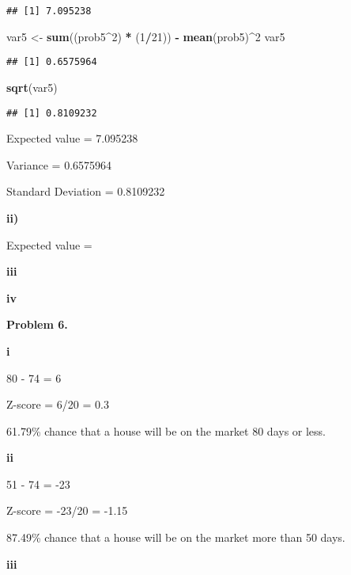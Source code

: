 \documentclass[
]{article}
\newenvironment{Shaded}{\begin{snugshade}}{\end{snugshade}}
\newcommand{\DecValTok}[1]{\textcolor[rgb]{0.00,0.00,0.81}{#1}}
\newcommand{\KeywordTok}[1]{\textcolor[rgb]{0.13,0.29,0.53}{\textbf{#1}}}
\newcommand{\NormalTok}[1]{#1}
\newcommand{\OperatorTok}[1]{\textcolor[rgb]{0.81,0.36,0.00}{\textbf{#1}}}
\newcommand{\StringTok}[1]{\textcolor[rgb]{0.31,0.60,0.02}{#1}}
\begin{document}
\begin{verbatim}
## [1] 7.095238
\end{verbatim}

\begin{Shaded}
\begin{Highlighting}[]
\NormalTok{var5 <-}\StringTok{ }\KeywordTok{sum}\NormalTok{((prob5}\OperatorTok{^}\DecValTok{2}\NormalTok{) }\OperatorTok{*}\StringTok{ }\NormalTok{(}\DecValTok{1}\OperatorTok{/}\DecValTok{21}\NormalTok{)) }\OperatorTok{-}\StringTok{ }\KeywordTok{mean}\NormalTok{(prob5)}\OperatorTok{^}\DecValTok{2}
\NormalTok{var5}
\end{Highlighting}
\end{Shaded}

\begin{verbatim}
## [1] 0.6575964
\end{verbatim}

\begin{Shaded}
\begin{Highlighting}[]
\KeywordTok{sqrt}\NormalTok{(var5)}
\end{Highlighting}
\end{Shaded}

\begin{verbatim}
## [1] 0.8109232
\end{verbatim}

Expected value = 7.095238

Variance = 0.6575964

Standard Deviation = 0.8109232

\textbf{ii)}

Expected value =

\textbf{iii}

\textbf{iv}

\textbf{Problem 6.}

\textbf{i}

80 - 74 = 6

Z-score = 6/20 = 0.3

61.79\% chance that a house will be on the market 80 days or less.

\textbf{ii}

51 - 74 = -23

Z-score = -23/20 = -1.15

87.49\% chance that a house will be on the market more than 50 days.

\textbf{iii}

\begin{Shaded}
\end{Shaded}
\end{document}

